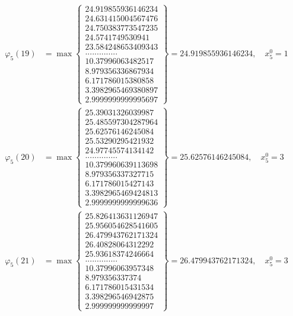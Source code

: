 \documentclass{article}
\begin{document}
\begin{align*}
  
  
  
\varphi_{5}(19) &= \max \left\{ \begin{array}{c}
24.919855936146234 \\
 24.631415004567476 \\
 24.750383773547235 \\
 24.5741749530941 \\
 23.584248653409343 \\
 .............. \\
 10.37996063482517 \\
 8.979356336867934 \\
 6.171786015380858 \\
 3.3982965469380897 \\
 2.9999999999995697
\end{array} \right\} = 24.919855936146234, \quad x_{5}^0 = 1\\
  
  
  
  
\varphi_{5}(20) &= \max \left\{ \begin{array}{c}
25.39031326039987 \\
 25.485597304287964 \\
 25.62576146245084 \\
 25.53290295421932 \\
 24.97745574134142 \\
 .............. \\
 10.379960639113698 \\
 8.979356337327715 \\
 6.171786015427143 \\
 3.3982965469424813 \\
 2.9999999999999636
\end{array} \right\} = 25.62576146245084, \quad x_{5}^0 = 3\\
  
  
  
  
\varphi_{5}(21) &= \max \left\{ \begin{array}{c}
25.826413631126947 \\
 25.956054628541605 \\
 26.479943762171324 \\
 26.40828064312292 \\
 25.93618374246664 \\
 .............. \\
 10.37996063957348 \\
 8.979356337374 \\
 6.171786015431534 \\
 3.398296546942875 \\
 2.999999999999997
\end{array} \right\} = 26.479943762171324, \quad x_{5}^0 = 3\\
  

\end{align*}
\end{document}
